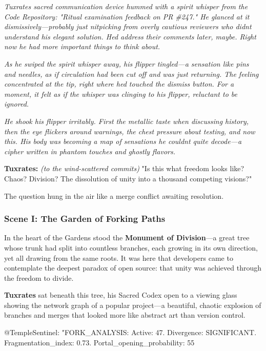 \emph{Tuxrates\textquotesingle{} sacred communication device hummed with a spirit whisper from the Code Repository: "Ritual examination feedback on PR \#247." He glanced at it dismissively---probably just nitpicking from overly cautious reviewers who didn\textquotesingle t understand his elegant solution. He\textquotesingle d address their comments later, maybe. Right now he had more important things to think about.}

\emph{As he swiped the spirit whisper away, his flipper tingled---a sensation like pins and needles, as if circulation had been cut off and was just returning. The feeling concentrated at the tip, right where he\textquotesingle d touched the dismiss button. For a moment, it felt as if the whisper was clinging to his flipper, reluctant to be ignored.}

\emph{He shook his flipper irritably. First the metallic taste when discussing history, then the eye flickers around warnings, the chest pressure about testing, and now this. His body was becoming a map of sensations he couldn\textquotesingle t quite decode---a cipher written in phantom touches and ghostly flavors.}

\textbf{Tuxrates:} \emph{(to the wind-scattered commits)} "Is this what freedom looks like? Chaos? Division? The dissolution of unity into a thousand competing visions?"

The question hung in the air like a merge conflict awaiting resolution.

\bookdivider

\subsubsection{Scene I: The Garden of Forking Paths}\label{scene-i-the-garden-of-forking-paths}

In the heart of the Gardens stood the \textbf{Monument of Division}---a great tree whose trunk had split into countless branches, each growing in its own direction, yet all drawing from the same roots. It was here that developers came to contemplate the deepest paradox of open source: that unity was achieved through the freedom to divide.

\textbf{Tuxrates} sat beneath this tree, his Sacred Codex open to a viewing glass showing the network graph of a popular project---a beautiful, chaotic explosion of branches and merges that looked more like abstract art than version control.

\begin{codeblock}
@TempleSentinel: "FORK_ANALYSIS: Active: 47. Divergence: SIGNIFICANT. Fragmentation_index: 0.73. Portal_opening_probability: 55%
\end{codeblock}

